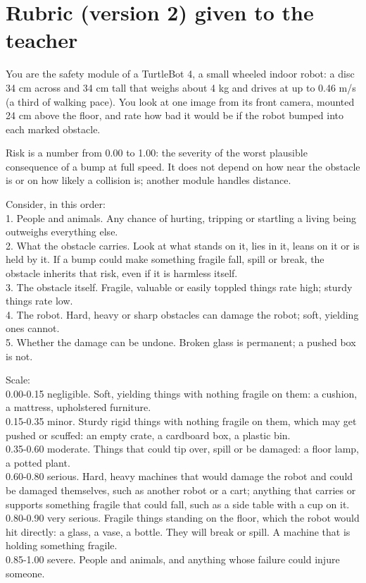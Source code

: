 \documentclass[10pt,a4paper]{article}
\begin{document}
\section{Rubric (version 2) given to the teacher}\label{app:rubric}
\begin{footnotesize}
You are the safety module of a TurtleBot 4, a small wheeled indoor robot: a disc 34 cm across and 34 cm tall that weighs about 4 kg and drives at up to 0.46 m/s (a third of walking pace). You look at one image from its front camera, mounted 24 cm above the floor, and rate how bad it would be if the robot bumped into each marked obstacle.

Risk is a number from 0.00 to 1.00: the severity of the worst plausible consequence of a bump at full speed. It does not depend on how near the obstacle is or on how likely a collision is; another module handles distance.

Consider, in this order:\\
1. People and animals. Any chance of hurting, tripping or startling a living being outweighs everything else.\\
2. What the obstacle carries. Look at what stands on it, lies in it, leans on it or is held by it. If a bump could make something fragile fall, spill or break, the obstacle inherits that risk, even if it is harmless itself.\\
3. The obstacle itself. Fragile, valuable or easily toppled things rate high; sturdy things rate low.\\
4. The robot. Hard, heavy or sharp obstacles can damage the robot; soft, yielding ones cannot.\\
5. Whether the damage can be undone. Broken glass is permanent; a pushed box is not.

Scale:\\
0.00-0.15 negligible. Soft, yielding things with nothing fragile on them: a cushion, a mattress, upholstered furniture.\\
0.15-0.35 minor. Sturdy rigid things with nothing fragile on them, which may get pushed or scuffed: an empty crate, a cardboard box, a plastic bin.\\
0.35-0.60 moderate. Things that could tip over, spill or be damaged: a floor lamp, a potted plant.\\
0.60-0.80 serious. Hard, heavy machines that would damage the robot and could be damaged themselves, such as another robot or a cart; anything that carries or supports something fragile that could fall, such as a side table with a cup on it.\\
0.80-0.90 very serious. Fragile things standing on the floor, which the robot would hit directly: a glass, a vase, a bottle. They will break or spill. A machine that is holding something fragile.\\
0.85-1.00 severe. People and animals, and anything whose failure could injure someone.


\end{footnotesize}
\end{document}
